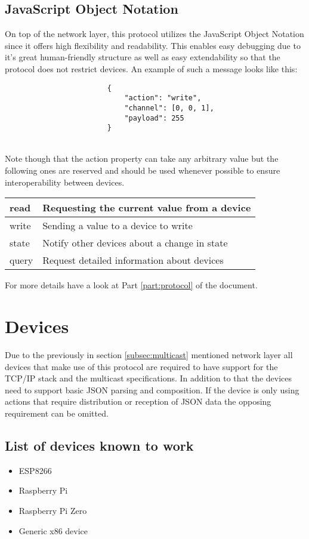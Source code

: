 \documentclass[11pt,a4paper, titlepage]{article}
\begin{document}
			\subsection[JSON]{JavaScript Object Notation}
				On top of the network layer, this protocol utilizes the JavaScript Object Notation since it offers high flexibility and readability. This enables easy debugging due to it's great human-friendly structure as well as easy extendability so that the protocol does not restrict devices. An example of such a message looks like this:
				\begin{listing}
					\begin{verbatim}
						{
							"action": "write",
							"channel": [0, 0, 1],
							"payload": 255
						}
					\end{verbatim}
					\caption{Simplest write request}
					\label{SimplestJSON}
				\end{listing}
				\\
				Note though that the action property can take any arbitrary value but the following ones are reserved and should be used whenever possible to ensure interoperability between devices.
				\label{actionTypes}
				\begin{center}
					\def\arraystretch{2}
					\begin{tabular}{ l | l }	
						read & Requesting the current value from a device \\
						\hline
						write & Sending a value to a device to write \\
						\hline
						state & Notify other devices about a change in state \\
						\hline
						query & Request detailed information about devices
					\end{tabular}
				\end{center}
				For more details have a look at Part \ref{part:protocol} of the document.
		
		\section{Devices}
			Due to the previously in section \ref{subsec:multicast} mentioned network layer all devices that make use of this protocol are required to have support for the TCP/IP stack and the multicast specifications. In addition to that the devices need to support basic JSON parsing and composition. If the device is only using actions that require distribution or reception of JSON data the opposing requirement can be omitted.
			\subsection[Examples]{List of devices known to work}
				\begin{itemize}
					\item ESP8266
					\item Raspberry Pi
					\item Raspberry Pi Zero
					\item Generic x86 device
				\end{itemize}
			
\end{document}
